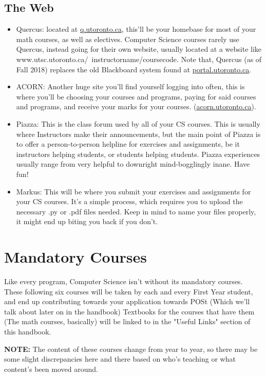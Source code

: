 \documentclass[11pt]{article}
\begin{document}
\subsection{The Web}
\begin{itemize}
\item Quercus: located at \url{q.utoronto.ca}, this'll be your homebase for most of your math courses, as well as electives.  Computer Science courses rarely use Quercus, instead going for their own website, usually located at a website like www.utsc.utoronto.ca/~instructorname/coursecode. Note that, Quercus (as of Fall 2018) replaces the old Blackboard system found at \url{portal.utoronto.ca}.
\item ACORN: Another huge site you'll find yourself logging into often, this is where you'll be choosing your courses and programs, paying for said courses and programs, and receive your marks for your courses. (\url{acorn.utoronto.ca}).
\item Piazza: This is the class forum used by all of your CS courses.  This is usually where Instructors make their announcements, but the main point of Piazza is to offer a person-to-person helpline for exercises and assignments, be it instructors helping students, or students helping students.  Piazza experiences usually range from very helpful to downright mind-bogglingly inane.  Have fun!
\item Markus: This will be where you submit your exercises and assignments for your CS courses.  It's a simple process, which requires you to upload the necessary .py or .pdf files needed.  Keep in mind to name your files properly, it might end up biting you back if you don't.
\end{itemize}

\section{Mandatory Courses}
Like every program, Computer Science isn't without its mandatory courses.  These following six courses will be taken by each and every First Year student, and end up contributing towards your application towards POSt (Which we'll talk about later on in the handbook) Textbooks for the courses that have them (The math courses, basically) will be linked to in the "Useful Links" section of this handbook.\par  \textbf{NOTE:} The content of these courses change from year to year, so there may be some slight discrepancies here and there based on who's teaching or what content's been moved around.
\end{document}
